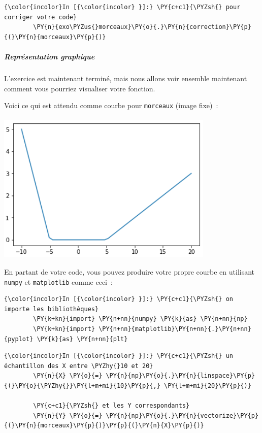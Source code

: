     \begin{Verbatim}[commandchars=\\\{\}]
{\color{incolor}In [{\color{incolor} }]:} \PY{c+c1}{\PYZsh{} pour corriger votre code}
        \PY{n}{exo\PYZus{}morceaux}\PY{o}{.}\PY{n}{correction}\PY{p}{(}\PY{n}{morceaux}\PY{p}{)}
\end{Verbatim}


    \hypertarget{repruxe9sentation-graphique}{%
\subparagraph{Représentation
graphique}\label{repruxe9sentation-graphique}}

    L'exercice est maintenant terminé, mais nous allons voir ensemble
maintenant comment vous pourriez visualiser votre fonction.

Voici ce qui est attendu comme courbe pour \texttt{morceaux} (image
fixe)~:\\\\
 \includegraphics{medias/morceaux.png}

    En partant de votre code, vous pouvez produire votre propre courbe en
utilisant \texttt{numpy} et \texttt{matplotlib} comme ceci~:

    \begin{Verbatim}[commandchars=\\\{\}]
{\color{incolor}In [{\color{incolor} }]:} \PY{c+c1}{\PYZsh{} on importe les bibliothèques}
        \PY{k+kn}{import} \PY{n+nn}{numpy} \PY{k}{as} \PY{n+nn}{np}
        \PY{k+kn}{import} \PY{n+nn}{matplotlib}\PY{n+nn}{.}\PY{n+nn}{pyplot} \PY{k}{as} \PY{n+nn}{plt}
\end{Verbatim}


    \begin{Verbatim}[commandchars=\\\{\}]
{\color{incolor}In [{\color{incolor} }]:} \PY{c+c1}{\PYZsh{} un échantillon des X entre \PYZhy{}10 et 20}
        \PY{n}{X} \PY{o}{=} \PY{n}{np}\PY{o}{.}\PY{n}{linspace}\PY{p}{(}\PY{o}{\PYZhy{}}\PY{l+m+mi}{10}\PY{p}{,} \PY{l+m+mi}{20}\PY{p}{)}
        
        \PY{c+c1}{\PYZsh{} et les Y correspondants}
        \PY{n}{Y} \PY{o}{=} \PY{n}{np}\PY{o}{.}\PY{n}{vectorize}\PY{p}{(}\PY{n}{morceaux}\PY{p}{)}\PY{p}{(}\PY{n}{X}\PY{p}{)}
\end{Verbatim}


